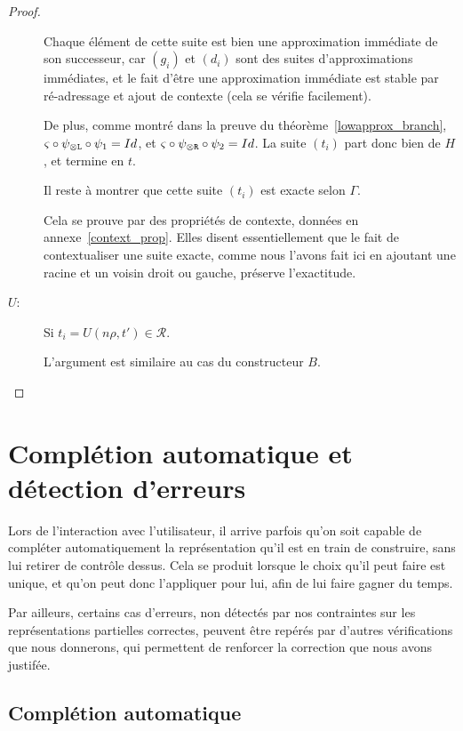 \documentclass[11pt,a4paper]{article}
\theoremstyle{plain}
\theoremstyle{definition}
\theoremstyle{remark}
\newcommand*{\tensor}{\otimes}
\newcommand*{\someperm}{\varsigma}
\newcommand*{\sequent}{\Gamma}
\newcommand*{\Left}{\textnormal{\texttt{L}}}
\newcommand*{\Right}{\textnormal{\texttt{R}}}
\newcommand*{\representations}{\ensuremath{\mathcal{R}}}
\begin{document}
\begin{proof}
\begin{description}
            Chaque élément de cette suite est bien une approximation immédiate de son successeur, car $(g_i)$ et $(d_i)$ sont des suites d'approximations immédiates, et le fait d'être une approximation immédiate est stable par ré-adressage et ajout de contexte (cela se vérifie facilement).
    
            De plus, comme montré dans la preuve du théorème~\ref{lowapprox_branch}, $\someperm \circ \psi_{\tensor\Left} \circ \psi_1 = Id$, et $\someperm \circ \psi_{\tensor\Right} \circ \psi_2 = Id$. La suite $(t_i)$ part donc bien de $H$, et termine en $t$.
    
            Il reste à montrer que cette suite $(t_i)$ est exacte selon $\sequent$.

            Cela se prouve par des propriétés de contexte, données en annexe~\ref{context_prop}. Elles disent essentiellement que le fait de contextualiser une suite exacte, comme nous l'avons fait ici en ajoutant une racine et un voisin droit ou gauche, préserve l'exactitude. 

        \item[$U$:]
            Si $t_i = U(n\rho, t') \in \representations$.
            
            L'argument est similaire au cas du constructeur $B$.
    \end{description}
\end{proof}

\section{Complétion automatique et détection d'erreurs}

Lors de l'interaction avec l'utilisateur, il arrive parfois qu'on soit capable de compléter automatiquement la représentation qu'il est en train de construire, sans lui retirer de contrôle dessus. Cela se produit lorsque le choix qu'il peut faire est unique, et qu'on peut donc l'appliquer pour lui, afin de lui faire gagner du temps.

Par ailleurs, certains cas d'erreurs, non détectés par nos contraintes sur les représentations partielles correctes, peuvent être repérés par d'autres vérifications que nous donnerons, qui permettent de renforcer la correction que nous avons justifée.

\subsection{Complétion automatique}
\end{document}
